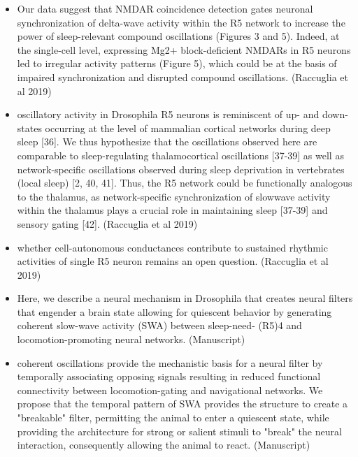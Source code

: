 \documentclass[11pt]{article}
\begin{document}
\begin{itemize}
    \item Our data suggest that NMDAR coincidence detection gates neuronal synchronization of delta-wave activity within the R5 network to increase the power of sleep-relevant compound oscillations (Figures 3 and 5). Indeed, at the single-cell level, expressing Mg2+ block-deficient NMDARs in R5 neurons led to irregular activity patterns (Figure 5), which could be at the basis of impaired synchronization and disrupted compound oscillations.
    \cite{raccugliaNetworkSpecificSynchronizationElectrical2019} (Raccuglia et al 2019)

    \item oscillatory activity in Drosophila R5 neurons is reminiscent of up- and down-states occurring at the level of mammalian cortical networks during deep sleep [36].
    We thus hypothesize that the oscillations observed here are comparable to sleep-regulating thalamocortical oscillations [37-39] as well as network-specific oscillations observed during sleep deprivation in vertebrates (local sleep) [2, 40, 41]. Thus, the R5 network could be functionally analogous to the thalamus, as network-specific synchronization of slowwave activity within the thalamus plays a crucial role in maintaining sleep [37-39] and sensory gating [42].
    \cite{raccugliaNetworkSpecificSynchronizationElectrical2019} (Raccuglia et al 2019)

    \item whether cell-autonomous conductances contribute to sustained rhythmic activities of single R5 neuron remains an open question.
    \cite{raccugliaNetworkSpecificSynchronizationElectrical2019} (Raccuglia et al 2019)

    \item Here, we describe a neural mechanism in Drosophila that creates neural filters
    that engender a brain state allowing for quiescent behavior by generating coherent slow-wave
    activity (SWA) between sleep-need- (R5)4 and locomotion-promoting neural networks.
    \cite{raccugliaCoherentMultilevelNetwork2022} (Manuscript)

    \item coherent oscillations provide the mechanistic basis for a neural filter
    by temporally associating opposing signals resulting in reduced functional connectivity
    between locomotion-gating and navigational networks. We propose that the temporal
    pattern of SWA provides the structure to create a "breakable" filter, permitting the animal to
    enter a quiescent state, while providing the architecture for strong or salient stimuli to "break"
    the neural interaction, consequently allowing the animal to react.
    \cite{raccugliaCoherentMultilevelNetwork2022} (Manuscript)


\end{itemize}
\end{document}
